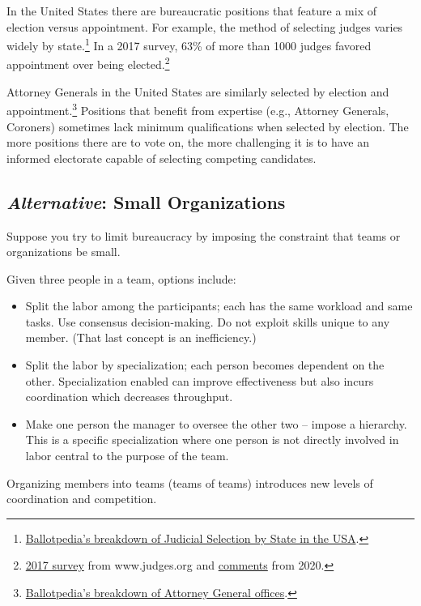 In the United States there are bureaucratic positions that feature a mix of election versus appointment. For example, the method of selecting judges varies widely by state.\footnote{\href{https://ballotpedia.org/Judicial_selection_in_the_states}{Ballotpedia's breakdown of Judicial Selection by State in the USA}.} In a 2017 survey, 63\% of more than 1000 judges favored appointment over being elected.\footnote{\href{https://www.judges.org/news-and-info/the-age-old-question-should-judges-be-appointed-or-elected-heres-what-you-said/}{2017 survey} from www.judges.org and \href{https://www.judges.org/wp-content/uploads/2020/03/Q1_Text.pdf}{comments} from 2020.}

Attorney Generals in the United States are similarly  selected by election and appointment.\footnote{%
\href{https://ballotpedia.org/Attorney_General_office_comparison}{Ballotpedia's breakdown of Attorney General offices}.}  Positions that benefit from expertise (e.g., Attorney Generals, Coroners) sometimes lack minimum qualifications when selected by election. The more positions there are to vote on, the more challenging it is to have an informed electorate capable of selecting competing candidates.

\subsection*{\textit{Alternative}: Small Organizations}

Suppose you try to limit bureaucracy by imposing the constraint that teams or organizations be small.

Given three people in a team, options include:
\begin{itemize}
    \item Split the labor among the participants; each has the same workload and same tasks. Use consensus decision-making. Do not exploit skills unique to any member. (That last concept is an inefficiency.)
    \item Split the labor by specialization; each person becomes dependent on the other. Specialization enabled can improve effectiveness but also incurs coordination which decreases throughput.
    \item Make one person the manager to oversee the other two -- impose a hierarchy. This is a specific  specialization where one person is not directly involved in labor central to the purpose of the team.
\end{itemize}
Organizing members into teams (teams of teams) introduces new levels of coordination and competition.

